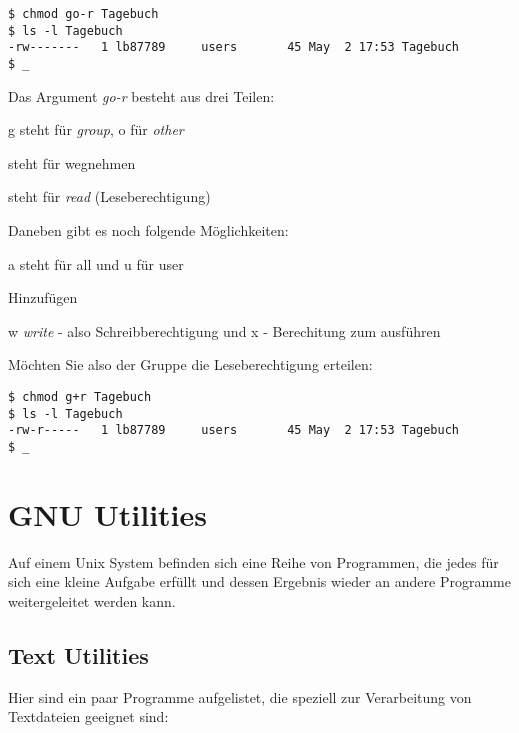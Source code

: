 \documentclass[titlepage,a4paper]{article}
\begin{document}
\begin{verbatim}
$ chmod go-r Tagebuch
$ ls -l Tagebuch
-rw-------   1 lb87789     users       45 May  2 17:53 Tagebuch
$ _
\end{verbatim}

Das Argument \emph{go-r} besteht aus drei Teilen:

\begin{description}
\setlength{\itemsep}{0pt}
\item[go] g steht für \emph{group}, o für \emph{other}
\item[-] steht für wegnehmen
\item[r] steht für \emph{read} (Leseberechtigung)
\end{description}

Daneben gibt es noch folgende Möglichkeiten:

\begin{description}
\setlength{\itemsep}{0pt}
\item[au] a steht für all und u für user
\item[+] Hinzufügen
\item[wx] w \emph{write} - also Schreibberechtigung und x - Berechitung zum
  ausführen
\end{description}

Möchten Sie also der Gruppe die Leseberechtigung erteilen:

\begin{verbatim}
$ chmod g+r Tagebuch
$ ls -l Tagebuch
-rw-r-----   1 lb87789     users       45 May  2 17:53 Tagebuch
$ _
\end{verbatim}

\section{GNU Utilities}
\label{sec:utilities}

Auf einem Unix System befinden sich eine Reihe von Programmen, 
die jedes für sich eine kleine Aufgabe erfüllt und dessen Ergebnis wieder
an andere Programme weitergeleitet werden kann.

\subsection{Text Utilities}

Hier sind ein paar Programme aufgelistet, die speziell zur Verarbeitung
von Textdateien geeignet sind:
\end{document}
